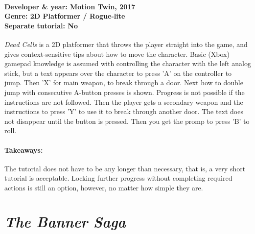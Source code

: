 \paragraph{Developer \& year: Motion Twin, 2017 \\ Genre: 2D Platformer / Rogue-lite \\ Separate tutorial: No \\}
\textit{Dead Cells} is a 2D platformer that throws the player straight into the game, and gives context-sensitive tips about how to move the character. Basic (Xbox) gamepad knowledge is assumed with controlling the character with the left analog stick, but a text appears over the character to press 'A' on the controller to jump. Then 'X' for main weapon, to break through a door. Next how to double jump with consecutive A-button presses is shown. Progress is not possible if the instructions are not followed. Then the player gets a secondary weapon and the instructions to press 'Y' to use it to break through another door. The text does not disappear until the button is pressed. Then you get the promp to press 'B' to roll.
\paragraph{Takeaways:}
The tutorial does not have to be any longer than necessary, that is, a very short tutorial is acceptable. Locking further progress without completing required actions is still an option, however, no matter how simple they are.

\section{\textit{The Banner Saga}}
